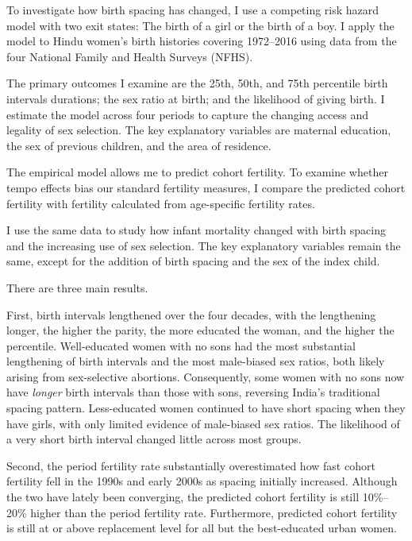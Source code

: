 \documentclass[12pt,letterpaper]{article}
\begin{document}
To investigate how birth spacing has changed, I use a competing risk hazard model with 
two exit states: The birth of a girl or the birth of a boy. 
I apply the model to Hindu women's birth histories covering 1972--2016 using data from the 
four National Family and Health Surveys (NFHS). 

The primary outcomes I examine are the 25th, 50th, and 75th percentile birth intervals 
durations;
the sex ratio at birth; and the likelihood of giving birth. 
I estimate the model across four periods to capture the changing access and 
legality of sex selection. 
The key explanatory variables are maternal education, the sex of previous children, and 
the area of residence.

The empirical model allows me to predict cohort fertility. 
To examine whether tempo effects bias our standard fertility measures, I compare 
the predicted cohort fertility with fertility calculated from age-specific fertility 
rates.

I use the same data to study how infant mortality changed with birth spacing and 
the increasing use of sex selection. 
The key explanatory variables remain the same, except for the addition of birth spacing 
and the sex of the index child. 

There are three main results.


First, birth intervals lengthened over the four decades, with the lengthening longer, the
higher the parity, the more educated the woman, and the higher the percentile.
Well-educated women with no sons had the most substantial lengthening of birth intervals 
and the most male-biased sex ratios, both likely arising from sex-selective abortions. 
Consequently, some women with no sons now have \emph{longer} birth intervals than those 
with sons, reversing India's traditional spacing pattern. 
Less-educated women continued to have short spacing when they have girls, with only limited 
evidence of male-biased sex ratios.
The likelihood of a very short birth interval changed little across most groups. 

Second, the period fertility rate substantially overestimated how fast cohort fertility 
fell in the 1990s and early 2000s as spacing initially increased. 
Although the two have lately been converging, the predicted cohort fertility is still 
10\%--20\% higher than the period fertility rate. 
Furthermore, predicted cohort fertility is still at or above replacement level for all but 
the best-educated urban women. 
\end{document}
